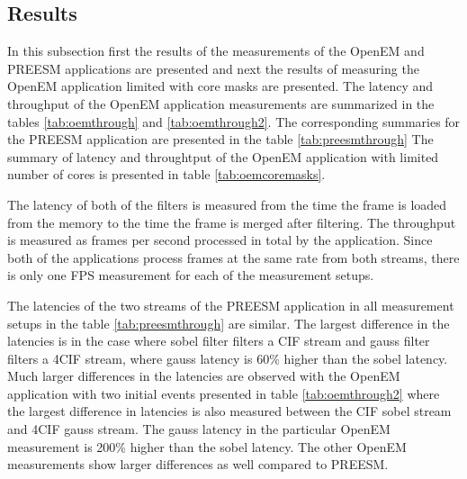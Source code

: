 \subsection{Results}
In this subsection first the results of the measurements of the OpenEM and
PREESM applications are presented and next the results of measuring the OpenEM
application limited with core masks are presented. The latency and throughput of
the OpenEM application measurements are summarized in the tables
\ref{tab:oemthrough} and \ref{tab:oemthrough2}. The corresponding summaries for
the PREESM application are presented in the table \ref{tab:preesmthrough} The
summary of latency and throughtput of the OpenEM application with limited number
of cores is presented in table \ref{tab:oemcoremasks}.

The latency of both of the filters is measured from the time the frame is loaded
from the memory to the time the frame is merged after filtering. The throughput
is measured as frames per second processed in total by the application. Since
both of the applications process frames at the same rate from both streams,
there is only one FPS measurement for each of the measurement setups.

The latencies of the two streams of the PREESM application in all measurement
setups in the table \ref{tab:preesmthrough} are similar. The largest difference
in the latencies is in the case where sobel filter filters a CIF stream and
gauss filter filters a 4CIF stream, where gauss latency is 60\% higher than the
sobel latency. Much larger differences in the latencies are observed with the
OpenEM application with two initial events presented in table
\ref{tab:oemthrough2} where the largest difference in latencies is also measured
between the CIF sobel stream and 4CIF gauss stream. The gauss latency in the
particular OpenEM measurement is 200\% higher than the sobel latency. The other
OpenEM measurements show larger differences as well compared to PREESM.

